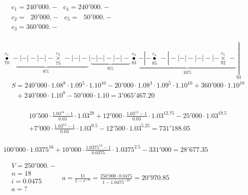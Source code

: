 \begin{solution}
$\begin{array}{ll}
  & {{c}_{1}}=240'000.-\text{     }{{\text{c}}_{\text{4}}}=240'000.- \\ 
 & {{c}_{2}}=\text{ }20'000.-\text{     }{{\text{c}}_{\text{5}}}=\text{  }50'000.- \\ 
 & {{c}_{3}}=360'000.- \\ 
\end{array}$

$\underbrace{\underset{70}{\overset{{{c}_{1}}}{\mathop{\bullet }}}\,-|-|-|-|-\underset{75}{\overset{{{c}_{2}}}{\mathop{\times }}}\,-|-|-}_{8\%}|\underbrace{-|-|-|-|-}_{9\%}\underset{83}{\overset{{{c}_{3}}}{\mathop{\bullet }}}\,\underbrace{-|-\underset{85}{\overset{{{c}_{4}}}{\mathop{\bullet }}}\,-|-|-|-|-|-|-\underset{92}{\overset{{{c}_{5}}}{\mathop{\times }}}\,-}_{10\%}\underset{93}{\mathop{|}}\,$
$\begin{array}{ll}
  & S=240'000\cdot {{1.08}^{8}}\cdot {{1.09}^{5}}\cdot {{1.10}^{10}}-20'000\cdot {{1.08}^{3}}\cdot {{1.09}^{5}}\cdot {{1.10}^{10}}+360'000\cdot {{1.10}^{10}} \\ 
 & \text{     }+240'000\cdot {{1.10}^{8}}-50'000\cdot 1.10=3'065'467.20 \\ 
\end{array}$
\end{solution}

\begin{solution}
\[\begin{array}{ll}
  & 10'500\cdot \frac{{{1.03}^{14}}-1}{0.03}\cdot {{1.03}^{28}}+12'000\cdot \frac{{{1.03}^{12}}-1}{0.03}\cdot {{1.03}^{12.75}}-25'000\cdot {{1.03}^{19.5}} \\ 
 & +7'000\cdot \frac{{{1.03}^{12}}-1}{0.03}\cdot {{1.03}^{9.5}}-12'500\cdot {{1.03}^{5.25}}=731'188.05 \\ 
\end{array}\]

$100'000\cdot {{1.0375}^{16}}+10'000\cdot \frac{{{1.0375}^{13}}-1}{0.0375}\cdot {{1.0375}^{2.5}}-331'000=28'677.35$
\end{solution}

\begin{solution}
$\begin{array}{ll}
  & V=250'000.- \\ 
 & n=18 \\ 
 & i=0.0475 \\ 
 & a=? \\ 
\end{array}$		
$a=\frac{Vi}{1-{{r}^{-n}}}=\frac{250'000\cdot 0.0475}{1-{{1.0475}^{-18}}}=20'970.85$
\end{solution}

